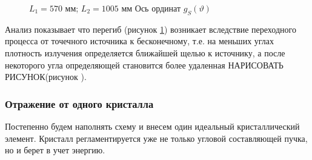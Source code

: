 \begin{figure}[H]
  \centering
  \hfill
  \hfill
  \hfill
  \caption{$L_1 = 570$ мм; $L_2 = 1005 $ мм \textcolor{mygreen}{ Ось ординат $g_S(\vartheta)$}}
  \label{ris:calc_slits_ability_res}
\end{figure}

Анализ показывает что перегиб (рисунок \ref{ris:calc_slits_ability_res}) возникает вследствие переходного
процесса от точечного источника к бесконечному, т.е. на меньших углах плотность излучения определяется ближайшей
щелью к источнику, а после некоторого угла определяющей становится более удаленная \textcolor{mygreen}{НАРИСОВАТЬ РИСУНОК}(рисунок ).

\subsubsection{Отражение от одного кристалла}
  Постепенно будем наполнять схему и внесем один идеальный кристаллический элемент.
  Кристалл регламентируется уже не только угловой составляющей пучка, но и берет в учет энергию.

